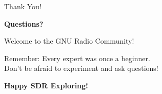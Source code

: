 \documentclass[aspectratio=169,12pt]{beamer}
\begin{document}
\begin{frame}{Thank You!}
\begin{center}
\Huge\textbf{Questions?}
\vspace{2em}

\Large
Welcome to the GNU Radio Community!

\vspace{1em}
\normalsize
Remember: Every expert was once a beginner.\\
Don't be afraid to experiment and ask questions!

\vspace{2em}
\textbf{Happy SDR Exploring!}
\end{center}
\end{frame}
\end{document}
